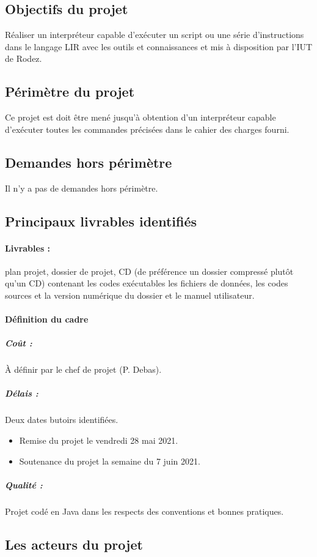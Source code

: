 \subsection{Objectifs du projet}
Réaliser un interpréteur capable d'exécuter un script ou une série
d'instructions dans le langage LIR avec les outils et connaissances
et mis à disposition par l’IUT de Rodez.

\subsection{Périmètre du projet}
Ce projet est doit être mené jusqu'à obtention d’un interpréteur
capable d’exécuter toutes les commandes précisées dans le cahier des
charges fourni.

\subsection{Demandes hors périmètre}
Il n’y a pas de demandes hors périmètre.

\subsection{Principaux livrables identifiés}
\paragraph{Livrables :} plan projet, dossier de projet, CD (de
préférence un dossier compressé plutôt qu’un CD) contenant les codes
exécutables les fichiers de données, les codes sources et la version
numérique du dossier et le manuel utilisateur.

\paragraph{Définition du cadre}
\subparagraph{Coût :} À définir par le chef de projet (P. Debas).
\subparagraph{Délais :} Deux dates butoirs identifiées.
\begin{itemize}
    \item Remise du projet le vendredi 28 mai 2021.
    \item Soutenance du projet la semaine du 7 juin 2021.
\end{itemize}

\subparagraph{Qualité :}
Projet codé en Java dans les respects des conventions et bonnes
pratiques.

\subsection{Les acteurs du projet}


